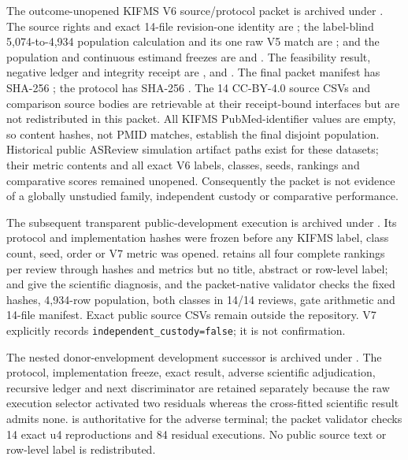 The outcome-unopened KIFMS V6 source/protocol packet is archived under
.  The source
rights and exact 14-file revision-one identity are
; the label-blind 5,074-to-4,934
population calculation and its one raw V5 match are
; and the population and continuous
estimand freezes are  and
.  The feasibility result, negative ledger and
integrity receipt are ,
 and
.  The final packet manifest has SHA-256
;
the protocol has SHA-256
.
The 14 CC-BY-4.0 source CSVs and comparison source bodies are retrievable at
their receipt-bound interfaces but are not redistributed in this packet.  All
KIFMS PubMed-identifier values are empty, so content hashes, not PMID matches,
establish the final disjoint population.  Historical public ASReview simulation
artifact paths exist for these datasets; their metric contents and all exact V6
labels, classes, seeds, rankings and comparative scores remained unopened.
Consequently the packet is not evidence of a globally unstudied family,
independent custody or comparative performance.

The subsequent transparent public-development execution is archived under
. Its protocol
and implementation hashes were frozen before any KIFMS label, class count,
seed, order or V7 metric was opened.  retains all four
complete rankings per review through hashes and metrics but no title, abstract
or row-level label;  and
 give the scientific diagnosis, and the
packet-native validator checks the fixed hashes, 4,934-row population, both
classes in 14/14 reviews, gate arithmetic and 14-file manifest. Exact public
source CSVs remain outside the repository. V7 explicitly records
\texttt{independent\_custody=false}; it is not confirmation.

The nested donor-envelopment development successor is archived under
. The protocol,
implementation freeze, exact result, adverse scientific adjudication, recursive
ledger and next discriminator are retained separately because the raw execution
selector activated two residuals whereas the cross-fitted scientific result
admits none.  is authoritative for the
adverse terminal; the packet validator checks 14 exact u4 reproductions and 84
residual executions. No public source text or row-level label is redistributed.

